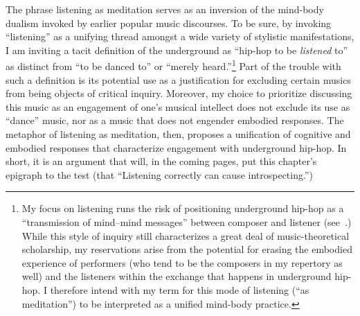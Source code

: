 The phrase listening as meditation serves as an inversion of the mind-body dualism invoked by 
earlier popular music discourses. To be sure, by invoking ``listening'' as a unifying thread 
amongst a wide variety of stylistic manifestations, I am inviting a tacit definition of the 
underground as ``hip-hop to be \emph{listened} to'' as distinct from ``to be danced to'' or 
``merely heard.''\footnote{
    My focus on listening runs the risk of positioning underground hip-hop as a ``transmission of mind--mind messages'' 
    between composer and listener (see~\autocite[20]{suzanneg.cusickFeministTheoryMusic1994}.) While this style of
    inquiry still characterizes a great deal of music-theoretical scholarship, my reservations arise from the potential
    for erasing the embodied experience of performers (who tend to be the composers in my repertory as well) and the
    listeners within the exchange that happens in underground hip-hop. I therefore intend with my term for this mode
    of listening (``as meditation'') to be interpreted as a unified mind-body practice.}
Part of the trouble with such a definition is its potential use as a justification  for excluding 
certain musics from being objects of critical inquiry. Moreover, my choice to prioritize discussing 
this music as an engagement of one's musical intellect does not exclude its use as ``dance'' 
music, nor as a music that does not engender embodied responses. The metaphor of listening 
as meditation, then, proposes a unification of cognitive and embodied responses that characterize
engagement with underground hip-hop. In short, it is an argument that will, in the coming pages,
put this chapter's epigraph to the test (that ``Listening correctly can cause introspecting.'')

